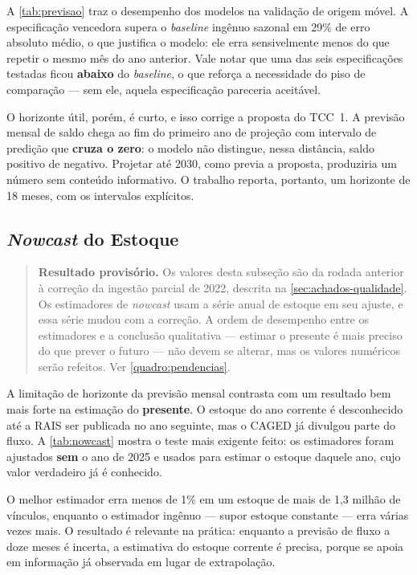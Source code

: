 

A \autoref{tab:previsao} traz o desempenho dos modelos na validação de origem móvel. A especificação vencedora supera o \textit{baseline} ingênuo sazonal em 29\% de erro absoluto médio, o que justifica o modelo: ele erra sensivelmente menos do que repetir o mesmo mês do ano anterior. Vale notar que uma das seis especificações testadas ficou \textbf{abaixo} do \textit{baseline}, o que reforça a necessidade do piso de comparação --- sem ele, aquela especificação pareceria aceitável.

O horizonte útil, porém, é curto, e isso corrige a proposta do TCC~1. A previsão mensal de saldo chega ao fim do primeiro ano de projeção com intervalo de predição que \textbf{cruza o zero}: o modelo não distingue, nessa distância, saldo positivo de negativo. Projetar até 2030, como previa a proposta, produziria um número sem conteúdo informativo. O trabalho reporta, portanto, um horizonte de 18 meses, com os intervalos explícitos.

\subsection{\textit{Nowcast} do Estoque}



\begin{quote}
\small
\textbf{Resultado provisório.} Os valores desta subseção são da rodada anterior à
correção da ingestão parcial de 2022, descrita na \autoref{sec:achados-qualidade}.
Os estimadores de \textit{nowcast} usam a série anual de estoque em seu ajuste, e
essa série mudou com a correção. A ordem de desempenho entre os estimadores e a
conclusão qualitativa --- estimar o presente é mais preciso do que prever o
futuro --- não devem se alterar, mas os valores numéricos serão refeitos. Ver
\autoref{quadro:pendencias}.
\end{quote}

A limitação de horizonte da previsão mensal contrasta com um resultado bem mais forte na estimação do \textbf{presente}. O estoque do ano corrente é desconhecido até a RAIS ser publicada no ano seguinte, mas o CAGED já divulgou parte do fluxo. A \autoref{tab:nowcast} mostra o teste mais exigente feito: os estimadores foram ajustados \textbf{sem} o ano de 2025 e usados para estimar o estoque daquele ano, cujo valor verdadeiro já é conhecido.

O melhor estimador erra menos de 1\% em um estoque de mais de 1,3 milhão de vínculos, enquanto o estimador ingênuo --- supor estoque constante --- erra várias vezes mais. O resultado é relevante na prática: enquanto a previsão de fluxo a doze meses é incerta, a estimativa do estoque corrente é precisa, porque se apoia em informação já observada em lugar de extrapolação.

